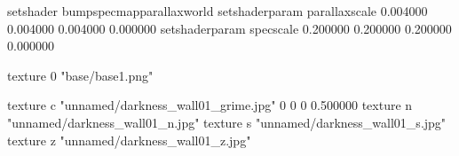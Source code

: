 setshader bumpspecmapparallaxworld
setshaderparam parallaxscale 0.004000 0.004000 0.004000 0.000000
setshaderparam specscale 0.200000 0.200000 0.200000 0.000000

texture 0 "base/base1.png"

texture c "unnamed/darkness_wall01_grime.jpg" 0 0 0 0.500000
texture n "unnamed/darkness_wall01_n.jpg"
texture s "unnamed/darkness_wall01_s.jpg"
texture z "unnamed/darkness_wall01_z.jpg"
